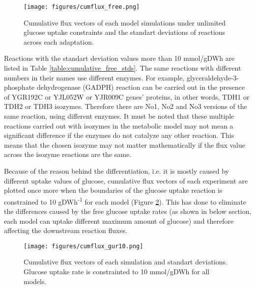 \begin{figure}[H]
  \begin{center}
  \texttt{[image: figures/cumflux\_free.png]}
  \caption[Cumulative flux vectors of each model simulations under unlimited glucose uptake constraints and the standart deviations of reactions across each adaptation]{Cumulative flux vectors of each model simulations under unlimited glucose uptake constraints and the standart deviations of reactions across each adaptation.}
  \label{fig:cumflux_free}
  \end{center}
\end{figure}

Reactions with the standart deviation values more than 10 mmol/gDWh are listed in Table \ref{table:cumulative_free_stds}. The same reactions with different numbers in their names use different enzymes. For example, glyceraldehyde-3-phosphate dehydrogenase (GADPH) reaction can be carried out in the presence of YGR192C or YJL052W or YJR009C genes' proteins, in other words, TDH1 or TDH2 or TDH3 isozymes. Therefore there are No1, No2 and No3 versions of the same reaction, using different enzymes. It must be noted that these multiple reactions carried out with isozymes in the metabolic model may not mean a significant difference if the enzymes do not catalyze any other reaction. This means that the chosen isozyme may not matter mathematically if the flux value across the isozyme reactions are the same.


Because of the reason behind the differentiation, i.e. it is mostly caused by different uptake values of glucose, cumulative flux vectors of each experiment are plotted once more when the boundaries of the glucose uptake reaction is constrained to 10 gDWh\textsuperscript{-1} for each model (Figure \ref{fig:cumflux_gur10}). This has done to eliminate the differences caused by the free glucose uptake rates (as shown in below section, each model can uptake different maximum amount of glucose) and therefore affecting the downstream reaction fluxes.

\begin{figure}[H]
  \begin{center}
  \texttt{[image: figures/cumflux\_gur10.png]}
  \caption[Cumulative flux vectors of each experiment when glucose uptake rate is constrained]{Cumulative flux vectors of each simulation and standart deviations. Glucose uptake rate is constrainted to 10 mmol/gDWh for all models. }
  \label{fig:cumflux_gur10}
  \end{center}
\end{figure}

